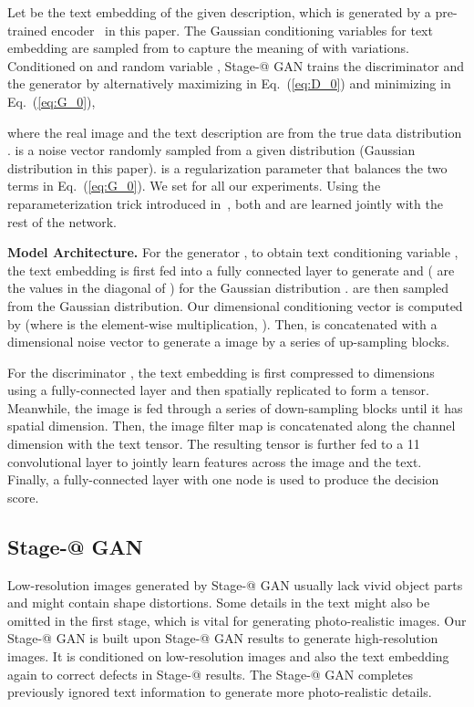 \documentclass[10pt,twocolumn,letterpaper]{article}
\makeatletter
\newcommand{\Rmnum}[1]{\expandafter\@slowromancap\romannumeral #1@}
\makeatother
\begin{document}
Let  be the text embedding of the given description, which is generated by a pre-trained encoder~\cite{reed2016cvpr} in this paper. The Gaussian conditioning variables  for text embedding are sampled from  to capture the meaning of  with variations. 
Conditioned on  and random variable , Stage-\Rmnum{1} GAN trains the discriminator  and the generator  by alternatively maximizing  in Eq.~(\ref{eq:D_0}) and minimizing  in Eq.~(\ref{eq:G_0}), 


where the real image  and the text description  are from the true data distribution . 
 is a noise vector randomly sampled from a given distribution  (Gaussian distribution in this paper). 
 is a regularization parameter that balances the two terms in Eq.~(\ref{eq:G_0}).
We set  for all our experiments. 
Using the reparameterization trick introduced in~\cite{KingmaW14}, both  and  are learned jointly with the rest of the network.  

\textbf{Model Architecture. }
For the generator , to obtain text conditioning variable , the text embedding  is first fed into a fully connected layer to generate  and  ( are the values in the diagonal of ) for the Gaussian distribution .  are then sampled from the Gaussian distribution.
Our  dimensional conditioning vector  is computed by  (where  is the element-wise multiplication, ). 
Then,  is concatenated with a  dimensional noise vector to generate a  image by a series of up-sampling blocks.  

For the discriminator , the text embedding  is first compressed to  dimensions using a fully-connected layer and then spatially replicated to form a  tensor. 
Meanwhile, the image is fed through a series of down-sampling blocks until it has  spatial dimension. 
Then, the image filter map is concatenated along the channel dimension with the text tensor. 
The resulting tensor is further fed to a 11 convolutional layer to jointly learn features across the image and the text. 
Finally, a fully-connected layer with one node is used to produce the decision score. 

\subsection{Stage-\Rmnum{2} GAN}
\vspace{-5pt}

Low-resolution images generated by Stage-\Rmnum{1} GAN usually lack vivid object parts and might contain shape distortions. Some details in the text might also be omitted in the first stage, which is vital for generating photo-realistic images.  
Our Stage-\Rmnum{2} GAN is built upon Stage-\Rmnum{1} GAN results to generate high-resolution images. 
It is conditioned on low-resolution images and also the text embedding again to correct defects in Stage-\Rmnum{1} results. The Stage-\Rmnum{2} GAN completes previously ignored text information to generate more photo-realistic details.
\end{document}
